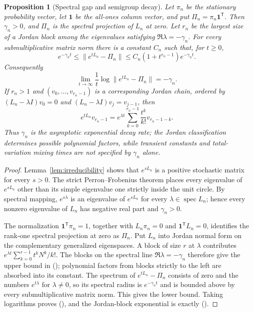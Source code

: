 \documentclass[twoside,10pt]{article}
\numberwithin{equation}{section}
\theoremstyle{slbody}
\newtheorem{proposition}[theorem]{Proposition}
\theoremstyle{definition}
\theoremstyle{remark}
\newcommand{\one}{\mathbf 1}
\newcommand{\spec}{\operatorname{spec}}
\renewcommand{\eqref}[1]{%
  \textup{{\normalfont(\oldstylenums{\ref{#1}}}\normalfont)}}
\begin{document}
\begin{proposition}[Spectral gap and semigroup decay]
\label{prop:gap-semigroup}
Let $\pi_n$ be the stationary probability vector, let $\one$ be the
all-ones column vector, and put
$\Pi_n=\pi_n\one^{\mathsf T}$.  Then $\gamma_n>0$, and $\Pi_n$ is the
spectral projection of $L_n$ at zero.  Let $r_n$ be the largest size of
a Jordan block among the eigenvalues satisfying
$\Re\lambda=-\gamma_n$.  For every submultiplicative matrix norm there
is a constant $C_n$ such that, for $t\ge0$,
\begin{equation}\label{eq:semigroup-gap-bound}
 e^{-\gamma_nt}
 \le \lVert e^{tL_n}-\Pi_n\rVert
 \le C_n(1+t^{r_n-1})e^{-\gamma_nt}.
\end{equation}
Consequently
\begin{equation}\label{eq:semigroup-gap-exponent}
 \lim_{t\to\infty}\frac1t
  \log\lVert e^{tL_n}-\Pi_n\rVert=-\gamma_n.
\end{equation}
If $r_n>1$ and
$(v_0,\ldots,v_{r_n-1})$ is a corresponding Jordan chain, ordered by
$(L_n-\lambda I)v_0=0$ and
$(L_n-\lambda I)v_j=v_{j-1}$, then
\begin{equation}\label{eq:semigroup-jordan-chain}
 e^{tL_n}v_{r_n-1}
 =e^{\lambda t}\sum_{k=0}^{r_n-1}\frac{t^k}{k!}v_{r_n-1-k}.
\end{equation}
Thus $\gamma_n$ is the asymptotic exponential decay rate; the Jordan
classification determines possible polynomial factors, while transient
constants and total-variation mixing times are not specified by
$\gamma_n$ alone.
\end{proposition}

\begin{proof}
Lemma~\ref{lem:irreducibility} shows that $e^{sL_n}$ is a positive
stochastic matrix for every $s>0$.  The strict Perron--Frobenius theorem
places every eigenvalue of $e^{sL_n}$ other than its simple eigenvalue one
strictly inside the unit circle.  By spectral mapping,
$e^{s\lambda}$ is an eigenvalue of $e^{sL_n}$ for every
$\lambda\in\spec L_n$; hence every nonzero eigenvalue of $L_n$ has
negative real part and $\gamma_n>0$.

The normalization $\one^{\mathsf T}\pi_n=1$, together with
$L_n\pi_n=0$ and $\one^{\mathsf T}L_n=0$, identifies the rank-one
spectral projection at zero as $\Pi_n$.  Put $L_n$ into Jordan normal
form on the complementary generalized eigenspaces.  A block of size
$r$ at $\lambda$ contributes
$e^{\lambda t}\sum_{k=0}^{r-1}t^kN^k/k!$.  The blocks on the spectral
line $\Re\lambda=-\gamma_n$ therefore give the upper bound in
\eqref{eq:semigroup-gap-bound}; polynomial factors from blocks strictly
to the left are absorbed into its constant.  The spectrum of
$e^{tL_n}-\Pi_n$ consists of zero and the numbers $e^{t\lambda}$ for
$\lambda\ne0$, so its spectral radius is $e^{-\gamma_nt}$ and is bounded
above by every submultiplicative matrix norm.  This gives the lower
bound.  Taking logarithms proves
\eqref{eq:semigroup-gap-exponent}, and the Jordan-block exponential is
exactly \eqref{eq:semigroup-jordan-chain}.
\end{proof}
\end{document}
